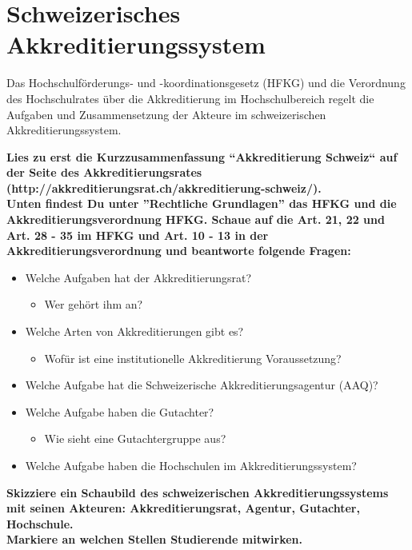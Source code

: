 \documentclass{scrartcl}
\begin{document}
\section*{Schweizerisches Akkreditierungssystem}

Das Hochschulförderungs- und -koordinationsgesetz (HFKG) und die Verordnung des Hochschulrates über die Akkreditierung im Hochschulbereich regelt die Aufgaben und Zusammensetzung der Akteure im schweizerischen Akkreditierungssystem.

\vspace{1cm}

\textbf{Lies zu erst die Kurzzusammenfassung ``Akkreditierung Schweiz`` auf der Seite des Akkreditierungsrates (http://akkreditierungsrat.ch/akkreditierung-schweiz/).\\
Unten findest Du  unter ''Rechtliche  Grundlagen'' das HFKG und die Akkreditierungsverordnung HFKG. Schaue auf die Art. 21, 22 und Art. 28 - 35 im HFKG und Art. 10 - 13 in der Akkreditierungsverordnung und beantworte folgende Fragen:}

\begin{itemize}
\item Welche Aufgaben hat der Akkreditierungsrat?
	\begin{itemize}
		\item Wer gehört ihm an?
	\end{itemize}
\item Welche Arten von Akkreditierungen gibt es?
\begin{itemize}
\item Wofür ist eine institutionelle Akkreditierung Voraussetzung?
\end{itemize}
\item Welche Aufgabe hat die Schweizerische Akkreditierungsagentur (AAQ)? 
\item Welche Aufgabe haben die Gutachter? 
	\begin{itemize}
		\item Wie sieht eine Gutachtergruppe aus?
	\end{itemize}
\item Welche Aufgabe haben die Hochschulen im Akkreditierungssystem?
\end{itemize}


\vspace{1cm}

\textbf{Skizziere ein Schaubild des schweizerischen Akkreditierungssystems mit seinen Akteuren: Akkreditierungsrat, Agentur, Gutachter, Hochschule. \\
Markiere an welchen Stellen Studierende mitwirken.}
\end{document}
